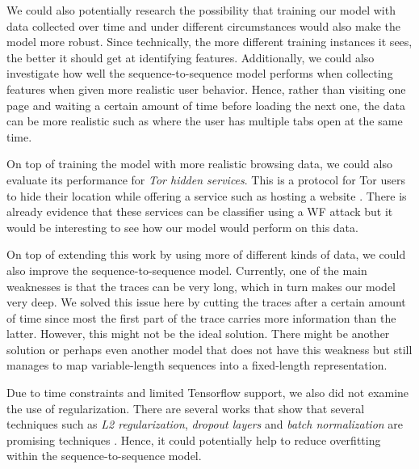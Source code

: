 We could also potentially research the possibility that training our model with data collected over time and under different circumstances would also make the model more robust.
Since technically, the more different training instances it sees, the better it should get at identifying features.
Additionally, we could also investigate how well the sequence-to-sequence model performs when collecting features when given more realistic user behavior.
Hence, rather than visiting one page and waiting a certain amount of time before loading the next one, the data can be more realistic such as where the user has multiple tabs open at the same time.

On top of training the model with more realistic browsing data, we could also evaluate its performance for \textit{Tor hidden services}.
This is a protocol for Tor users to hide their location while offering a service such as hosting a website \cite{tor_hidden_services}.
There is already evidence that these services can be classifier using a WF attack \cite{kfingerprinting} but it would be interesting to see how our model would perform on this data.

On top of extending this work by using more of different kinds of data, we could also improve the sequence-to-sequence model.
Currently, one of the main weaknesses is that the traces can be very long, which in turn makes our model very deep.
We solved this issue here by cutting the traces after a certain amount of time since most the first part of the trace carries more information than the latter.
However, this might not be the ideal solution.
There might be another solution or perhaps even another model that does not have this weakness but still manages to map variable-length sequences into a fixed-length representation.

Due to time constraints and limited Tensorflow support, we also did not examine the use of regularization.
There are several works that show that several techniques such as \textit{L2 regularization}, \textit{dropout layers} and \textit{batch normalization} are promising techniques \cite{ioffe2015batch,nielsen_2017}.
Hence, it could potentially help to reduce overfitting within the sequence-to-sequence model.
